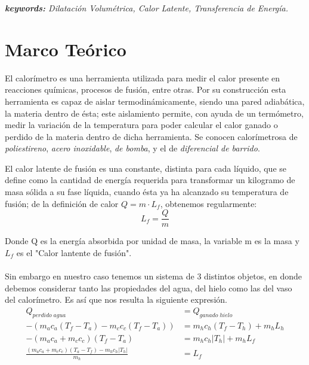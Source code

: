 \documentclass{article}
\begin{document}
\textit{\textbf{keywords:} Dilatación Volumétrica, Calor Latente, Transferencia de Energía.} \\

\hline

\section{Marco Teórico}
El calorímetro es una herramienta utilizada para medir el calor presente en reacciones químicas, procesos de fusión, entre otras. Por su construcción esta herramienta es capaz de aislar termodinámicamente, siendo una pared adiabática, la materia dentro de ésta; este aislamiento permite, con ayuda de un termómetro, medir la variación de la temperatura para poder calcular el calor ganado o perdido de la materia dentro de dicha herramienta. Se conocen calorímetrosa de \textit{poliestireno}, \textit{acero inoxidable}, \textit{de bomba}, y el de \textit{diferencial de barrido}. \cite{Calorímetro}
        
        El calor latente de fusión es una constante, distinta para cada líquido, que se define como la cantidad de energía requerida para transformar un kilogramo de masa sólida a su fase líquida, cuando ésta ya ha alcanzado su temperatura de fusión; de la definición de calor $Q = m \cdot L_{f}$, obtenemos regularmente:
        \begin{equation}
            L_{f} = \frac{Q}{m}
        \end{equation}
        
        Donde Q es la energía absorbida por unidad de masa, la variable m es la masa y $L_{f}$ es el "Calor lantente de fusión". \cite{CalorLatente} \\\\

        Sin embargo en nuestro caso tenemos un sistema de 3 distintos objetos, en donde debemos considerar tanto las propiedades del agua, del hielo como las del vaso del calorímetro. Es así que nos resulta la siguiente expresión.
        \begin{align*}
    Q_{perdido\;agua} &= Q_{ganado\;hielo} \\
    -(m_ac_a(T_f-T_a)-m_cc_c(T_f-T_a)) &= m_hc_h(T_f-T_h)+m_hL_h \\
    -(m_ac_a+m_cc_c)(T_f-T_a) &= m_hc_h|T_h| + m_hL_f \\
    \frac{(m_ac_a+m_cc_c)(T_a-T_f)-m_hc_h|T_h|}{m_h} &= L_f
\end{align*}
\end{document}
